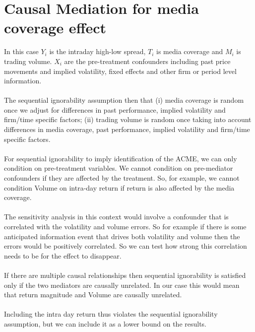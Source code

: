\documentclass{article}
\begin{document}
	
	
	
	
	 
	
	
	

	
	
	
	
	
	
	
	
	
	
	
	
	
	
	
	
	\section{Causal Mediation for media coverage effect}
	
	In this case $Y_i$ is the intraday high-low spread, $T_i$ is media coverage and $M_i$ is trading volume. $X_i$ are the pre-treatment confounders including past price movements and implied volatility, fixed effects and other firm or period level information. 
	\\~\\
	The sequential ignorability assumption then that (i) media coverage is random once we adjust for differences in past performance, implied volatility and firm/time specific factors; (ii) trading volume is random once taking into account differences in media coverage, past performance, implied volatility and firm/time specific factors. 
	\\~\\
	For sequential ignorability to imply identification of the ACME, we can only condition on pre-treatment variables. We cannot condition on pre-mediator confounders if they are affected by the treatment. So, for example, we cannot condition Volume on intra-day return if return is also affected by the media coverage.
	\\~\\
	The sensitivity analysis in this context would involve a confounder that is correlated with the volatility and volume errors. So for example if there is some anticipated information event that drives both volatility and volume then the errors would be positively correlated. So we can test how strong this correlation needs to be for the effect to disappear. 
	\\~\\
	If there are multiple causal relationships then sequential ignorability is satisfied only if the two mediators are causally unrelated. In our case this would mean that return magnitude and Volume are causally unrelated. 
	\\~\\
	Including the intra day return thus violates the sequential ignorability assumption, but we can include it as a lower bound on the results. 
	
\end{document}
